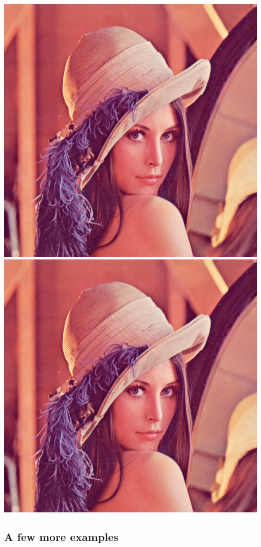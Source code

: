 \documentclass[12pt]{article}
\begin{document}
\includegraphics[width=.4\textwidth]{Lenna.png}
\includegraphics[keepaspectratio, scale=.5, clip=true, trim=20mm 25mm 80mm 90mm ]{Lenna}


% 






\newpage













\subsection{A few more examples}
\end{document}
